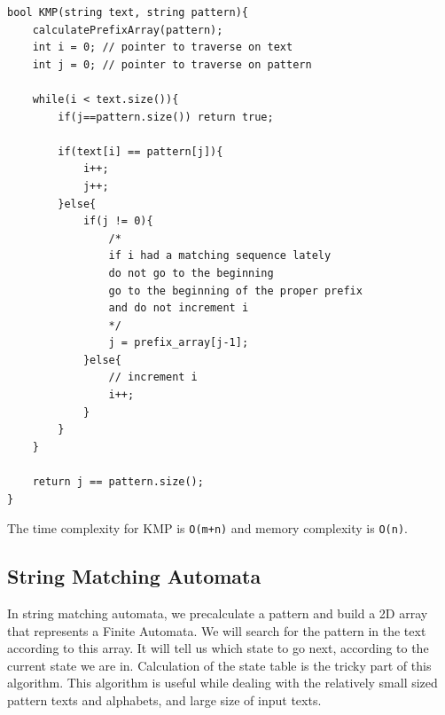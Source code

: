 \documentclass[12pt]{article}
\begin{document}
        \newpage
        
        \begin{verbatim}
bool KMP(string text, string pattern){
    calculatePrefixArray(pattern);
	int i = 0; // pointer to traverse on text
	int j = 0; // pointer to traverse on pattern

	while(i < text.size()){
		if(j==pattern.size()) return true;

		if(text[i] == pattern[j]){
			i++;
			j++;
		}else{
			if(j != 0){
				/*
				if i had a matching sequence lately
				do not go to the beginning
				go to the beginning of the proper prefix
				and do not increment i
				*/ 
				j = prefix_array[j-1];
			}else{
				// increment i
				i++;
			}
		}
	}

	return j == pattern.size();
}
        \end{verbatim}
        
        The time complexity for KMP is \texttt{O(m+n)} and memory complexity is \texttt{O(n)}.
        
        \subsection{String Matching Automata}
        In string matching automata, we precalculate a pattern and build a 2D array that represents a Finite Automata. We will search for the pattern in the text according to this array. It will tell us which state to go next, according to the current state we are in. Calculation of the state table is the tricky part of this algorithm. This algorithm is useful while dealing with the relatively small sized pattern texts and alphabets, and large size of input texts.
        
\end{document}
